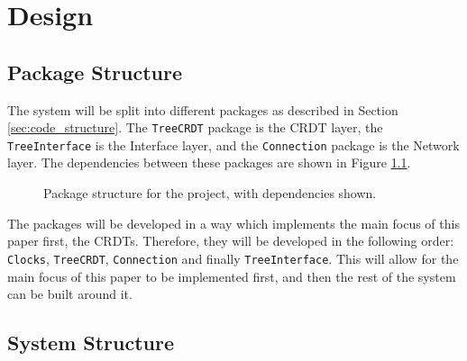 \documentclass[12pt]{report}
\begin{document}
\newpage
\chapter{Design}

\section{Package Structure}
The system will be split into different packages as described in Section \ref{sec:code_structure}. The \texttt{TreeCRDT} package is the CRDT layer, the \texttt{TreeInterface} is the Interface layer, and the \texttt{Connection} package is the Network layer. The dependencies between these packages are shown in Figure \ref{fig:packages}.

\begin{figure}[H] 
    \centering
    \caption{Package structure for the project, with dependencies shown.}
    \label{fig:packages}
\end{figure}

The packages will be developed in a way which implements the main focus of this paper first, the CRDTs. Therefore, they will be developed in the following order: \texttt{Clocks}, \texttt{TreeCRDT}, \texttt{Connection} and finally \texttt{TreeInterface}. This will allow for the main focus of this paper to be implemented first, and then the rest of the system can be built around it. \par

\section{System Structure}
\end{document}
